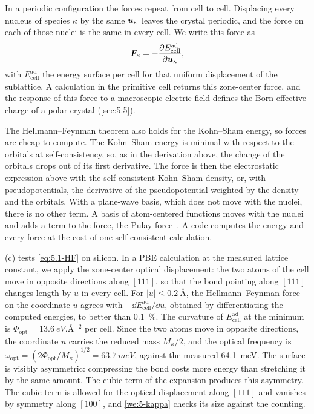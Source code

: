 In a periodic configuration the forces repeat from cell to cell. Displacing every nucleus of species $\kappa$ by the same $\bm{u}_\kappa$ leaves the crystal periodic, and the force on each of those nuclei is the same in every cell. We write this force as
\begin{equation}
  \bm{F}_\kappa = -\frac{\partial E^{\mathrm{ad}}_{\mathrm{cell}}}{\partial\bm{u}_\kappa} ,
  \label{eq:5.1-Fk}
\end{equation}
with $E^{\mathrm{ad}}_{\mathrm{cell}}$ the energy surface per cell for that uniform displacement of the sublattice. A calculation in the primitive cell returns this zone-center force, and the response of this force to a macroscopic electric field defines the Born effective charge of a polar crystal (\cref{sec:5.5}).

The Hellmann--Feynman theorem also holds for the Kohn--Sham energy, so forces are cheap to compute. The Kohn--Sham energy is minimal with respect to the orbitals at self-consistency, so, as in the derivation above, the change of the orbitals drops out of its first derivative. The force is then the electrostatic expression above with the self-consistent Kohn--Sham density, or, with pseudopotentials, the derivative of the pseudopotential weighted by the density and the orbitals. With a plane-wave basis, which does not move with the nuclei, there is no other term. A basis of atom-centered functions moves with the nuclei and adds a term to the force, the Pulay force~\cite{pulay1969ab}. A code computes the energy and every force at the cost of one self-consistent calculation.

(c) tests \cref{eq:5.1-HF} on silicon. In a PBE calculation at the measured lattice constant, we apply the zone-center optical displacement: the two atoms of the cell move in opposite directions along $[111]$, so that the bond pointing along $[111]$ changes length by $u$ in every cell. For $|u| \le \SI{0.2}{\angstrom}$, the Hellmann--Feynman force on the coordinate $u$ agrees with $-\dd E^{\mathrm{ad}}_{\mathrm{cell}}/\dd u$, obtained by differentiating the computed energies, to better than \SI{0.1}{\percent}. The curvature of $E^{\mathrm{ad}}_{\mathrm{cell}}$ at the minimum is $\Phi_{\mathrm{opt}} = \SI{13.6}{eV.\angstrom^{-2}}$ per cell. Since the two atoms move in opposite directions, the coordinate $u$ carries the reduced mass $M_\kappa/2$, and the optical frequency is $\omega_{\mathrm{opt}} = (2\Phi_{\mathrm{opt}}/M_\kappa)^{1/2} = \SI{63.7}{meV}$, against the measured \SI{64.1}{meV}. The surface is visibly asymmetric: compressing the bond costs more energy than stretching it by the same amount. The cubic term of the expansion produces this asymmetry. The cubic term is allowed for the optical displacement along $[111]$ and vanishes by symmetry along $[100]$, and \cref{we:5-kappa} checks its size against the counting.

